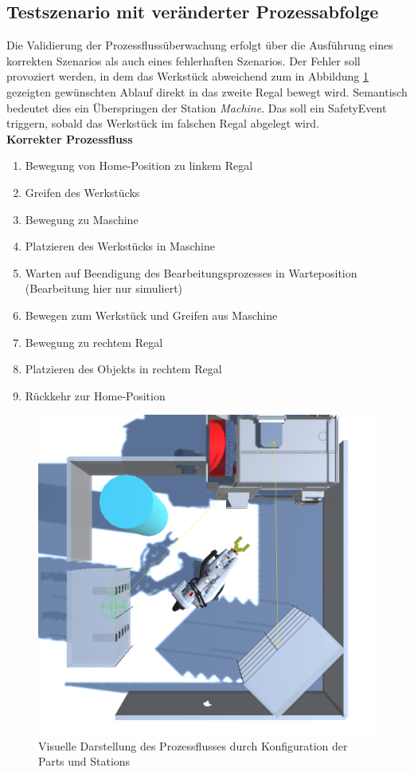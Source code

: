 \subsection{Testszenario mit veränderter Prozessabfolge}

Die Validierung der Prozessflussüberwachung erfolgt über die Ausführung eines
korrekten Szenarios als auch eines fehlerhaften Szenarios. Der Fehler soll
provoziert werden, in dem das Werkstück abweichend zum in Abbildung
\ref{figure:Prozessfluss} gezeigten gewünschten Ablauf direkt in das zweite
Regal bewegt wird. Semantisch bedeutet dies ein Überspringen der Station
\textit{Machine}. Das soll ein SafetyEvent triggern, sobald das Werkstück im
falschen Regal abgelegt wird.\\

\noindent
\textbf{Korrekter Prozessfluss}
\begin{enumerate}
	\item Bewegung von Home-Position zu linkem Regal
	\item Greifen des Werkstücks
	\item Bewegung zu Maschine
	\item Platzieren des Werkstücks in Maschine
	\item Warten auf Beendigung des Bearbeitungsprozesses in Warteposition (Bearbeitung hier nur simuliert)
	\item Bewegen zum Werkstück und Greifen aus Maschine
	\item Bewegung zu rechtem Regal
	\item Platzieren des Objekts in rechtem Regal
	\item Rückkehr zur Home-Position
\end{enumerate}
\begin{figure}[H]
	\centering
	\includegraphics[width=0.7\linewidth]{Figures/Prozessfolge.png}
	\caption{Visuelle Darstellung des Prozessflusses durch Konfiguration der Parts
		und Stations}
	\label{figure:Prozessfluss}
\end{figure}

